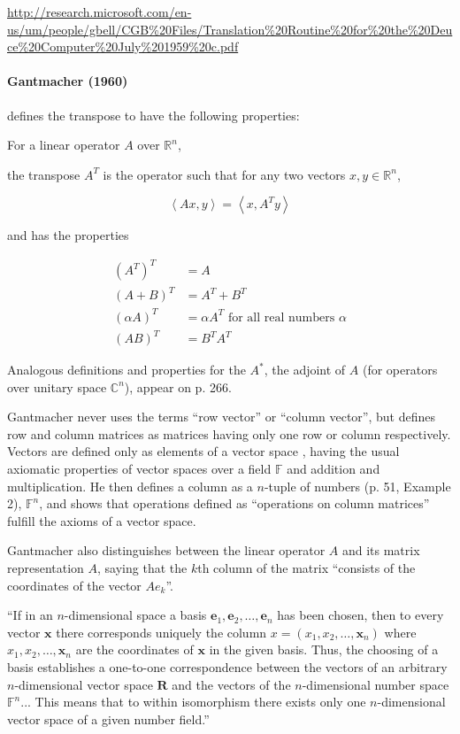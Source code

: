 \url{http://research.microsoft.com/en-us/um/people/gbell/CGB%20Files/Translation%20Routine%20for%20the%20Deuce%20Computer%20July%201959%20c.pdf}




\paragraph{Gantmacher (1960)~\cite{Gantmacher1960}}

\cite[p. 280, Definition 10]{Gantmacher1960} defines the transpose to have the following properties:

For a linear operator $A$ over $\mathbb R^n$,

the transpose $A^T$ is the operator such that for any two vectors $x, y \in \mathbb R^n$,

\[
\left\langle Ax, y \right\rangle = \left\langle x, A^T y \right\rangle
\]

and has the properties

\begin{align}
(A^T)^T & = A \\
(A + B)^T & = A^T + B^T \\
(\alpha A)^T & = \alpha A^T \textrm{ for all real numbers } \alpha \\
(A B)^T & = B^T A^T
\end{align}

Analogous definitions and properties for the $A^*$, the adjoint of $A$ (for operators over unitary space $\mathbb C^n$), appear on p. 266.

Gantmacher never uses the terms ``row vector'' or ``column vector'', but defines row and column matrices as matrices having only one row or column respectively. Vectors are defined only as elements of a vector space \cite[p. 51]{Gantmacher1960}, having the usual axiomatic properties of vector spaces over a field $\mathbb F$ and addition and multiplication. He then defines a column as a $n$-tuple of numbers (p. 51, Example 2), $\mathbb F^n$, and shows that operations defined as ``operations on column matrices'' fulfill the axioms of a vector space.

Gantmacher also distinguishes \cite[pp. 54-56]{Gantmacher1960} between the linear operator $A$ and its matrix representation $A$, saying that the $k$th column of the matrix ``consists of the coordinates of the vector $Ae_k$''.

``If in an $n$-dimensional space a basis $\mathbf e_1, \mathbf e_2, \dots, \mathbf e_n$ has been chosen, then to every vector $\mathbf x$ there corresponds uniquely the column $x = (x_1, x_2, \dots, \mathbf x_n)$ where $x_1, x_2, \dots, \mathbf x_n$ are the coordinates of $\mathbf x$ in the given basis. Thus, the choosing of a basis establishes a one-to-one correspondence between the vectors of an arbitrary $n$-dimensional vector space $\mathbf R$ and the vectors of the $n$-dimensional number space $\mathbb F^n$... This means that to within isomorphism there exists only one $n$-dimensional vector space of a given number field.''

